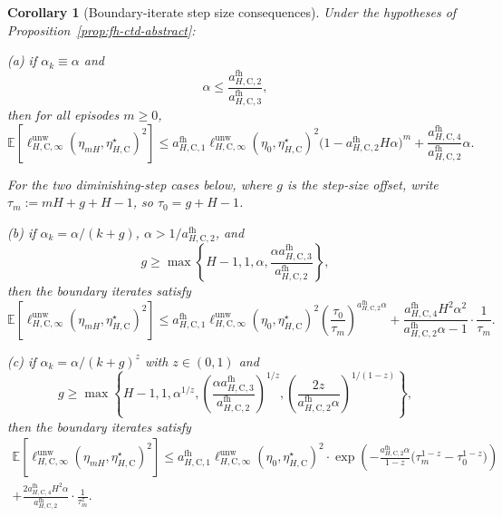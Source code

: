 \documentclass{article}
\newtheorem{corollary}[theorem]{Corollary}
\begin{document}
\begin{corollary}[Boundary-iterate step size consequences]
\label{cor:fh-ctd-steps}
Under the hypotheses of Proposition~\ref{prop:fh-ctd-abstract}:

\textup{(a)} if $\alpha_k \equiv \alpha$ and
\begin{equation}
\alpha \le \frac{a_{H,\mathrm C,2}^{\mathrm{fh}}}{a_{H,\mathrm C,3}^{\mathrm{fh}}},
\end{equation}
then for all episodes $m \ge 0$,
\begin{equation}
\mathbb E\left[ \ell_{H,\mathrm C,\infty}^{\mathrm{unw}}(\eta_{mH},\eta_{H,\mathrm C}^\star)^2 \right] \le a_{H,\mathrm C,1}^{\mathrm{fh}} \ell_{H,\mathrm C,\infty}^{\mathrm{unw}}(\eta_0,\eta_{H,\mathrm C}^\star)^2 \bigl(1-a_{H,\mathrm C,2}^{\mathrm{fh}}H\alpha\bigr)^m + \frac{a_{H,\mathrm C,4}^{\mathrm{fh}}}{a_{H,\mathrm C,2}^{\mathrm{fh}}}\alpha.
\end{equation}

For the two diminishing-step cases below, where $g$ is the step-size offset, write $\tau_m:=mH+g+H-1$, so $\tau_0=g+H-1$.

\textup{(b)} if $\alpha_k = \alpha/(k+g)$, $\alpha > 1/a_{H,\mathrm C,2}^{\mathrm{fh}}$, and
\begin{equation}
g \ge \max\left\{H-1,1,\alpha,\frac{\alpha a_{H,\mathrm C,3}^{\mathrm{fh}}}{a_{H,\mathrm C,2}^{\mathrm{fh}}}\right\},
\end{equation}
then the boundary iterates satisfy
\begin{equation}
\mathbb E\left[ \ell_{H,\mathrm C,\infty}^{\mathrm{unw}}(\eta_{mH},\eta_{H,\mathrm C}^\star)^2 \right] \le a_{H,\mathrm C,1}^{\mathrm{fh}}\ell_{H,\mathrm C,\infty}^{\mathrm{unw}}(\eta_0,\eta_{H,\mathrm C}^\star)^2 \left(\frac{\tau_0}{\tau_m}\right)^{a_{H,\mathrm C,2}^{\mathrm{fh}}\alpha}
+\frac{a_{H,\mathrm C,4}^{\mathrm{fh}}H^2\alpha^2}{a_{H,\mathrm C,2}^{\mathrm{fh}}\alpha-1}\cdot\frac{1}{\tau_m}.
\end{equation}

\textup{(c)} if $\alpha_k = \alpha/(k+g)^z$ with $z \in (0,1)$ and
\begin{equation}
g \ge \max\left\{ H-1,1,\alpha^{1/z}, \left(\frac{\alpha a_{H,\mathrm C,3}^{\mathrm{fh}}}{a_{H,\mathrm C,2}^{\mathrm{fh}}}\right)^{1/z}, \left(\frac{2z}{a_{H,\mathrm C,2}^{\mathrm{fh}}\alpha}\right)^{1/(1-z)} \right\},
\end{equation}
then the boundary iterates satisfy
\begin{equation}
\begin{gathered}
\mathbb E\left[ \ell_{H,\mathrm C,\infty}^{\mathrm{unw}}(\eta_{mH},\eta_{H,\mathrm C}^\star)^2 \right] \le a_{H,\mathrm C,1}^{\mathrm{fh}}\ell_{H,\mathrm C,\infty}^{\mathrm{unw}}(\eta_0,\eta_{H,\mathrm C}^\star)^2 \cdot\exp\left(-\frac{a_{H,\mathrm C,2}^{\mathrm{fh}}\alpha}{1-z}\bigl(\tau_m^{1-z}-\tau_0^{1-z}\bigr)\right)\\ +\frac{2a_{H,\mathrm C,4}^{\mathrm{fh}}H^2\alpha}{a_{H,\mathrm C,2}^{\mathrm{fh}}}\cdot\frac{1}{\tau_m^z}.
\end{gathered}
\end{equation}
\end{corollary}
\end{document}
